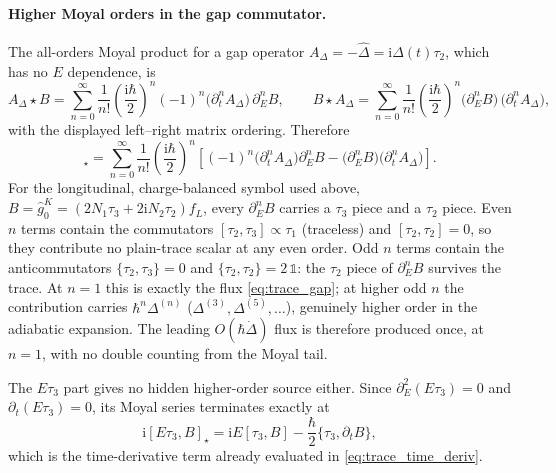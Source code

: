 \documentclass[
  aps,
  prb,
  preprint,
  superscriptaddress,
  longbibliography,
  nofootinbib
]{revtex4-2}
\newcommand{\ii}{\mathrm{i}}
\newcommand{\DOS}{N_1}
\newcommand{\fL}{f_L}
\newcommand{\hatg}{\hat{g}}
\newcommand{\hatD}{\hat{\Delta}}
\providecommand{\openone}{}\renewcommand{\openone}{\mathds{1}}
\begin{document}
\paragraph{Higher Moyal orders in the gap commutator.} The all-orders
Moyal product for a gap operator
\(A_\Delta=-\hatD=\ii\Delta(t)\tau_2\), which has no \(E\) dependence, is
\begin{equation}
  A_\Delta\star B
  =
  \sum_{n=0}^{\infty}
  \frac{1}{n!}\left(\frac{\ii\hbar}{2}\right)^n
  (-1)^n
  \bigl(\partial_t^n A_\Delta\bigr)\,
  \partial_E^n B,
  \qquad
  B\star A_\Delta
  =
  \sum_{n=0}^{\infty}
  \frac{1}{n!}\left(\frac{\ii\hbar}{2}\right)^n
  \bigl(\partial_E^n B\bigr)\,
  \bigl(\partial_t^n A_\Delta\bigr),
  \label{eq:gap_moyal_all_orders}
\end{equation}
with the displayed left--right matrix ordering. Therefore
\begin{equation}
  [A_\Delta,B]_\star
  =
  \sum_{n=0}^{\infty}
  \frac{1}{n!}\left(\frac{\ii\hbar}{2}\right)^n
  \left[
    (-1)^n\bigl(\partial_t^n A_\Delta\bigr)\partial_E^n B
    -
    \bigl(\partial_E^n B\bigr)\bigl(\partial_t^n A_\Delta\bigr)
  \right].
  \label{eq:gap_comm_all_orders}
\end{equation}
For the longitudinal, charge-balanced symbol used above,
\(B=\hatg_0^K=(2\DOS\tau_3+2\ii N_2\tau_2)\fL\), every
\(\partial_E^n B\) carries a \(\tau_3\) piece and a \(\tau_2\) piece. Even
\(n\) terms contain the commutators \([\tau_2,\tau_3]\propto\tau_1\)
(traceless) and \([\tau_2,\tau_2]=0\), so they contribute no plain-trace
scalar at any even order. Odd \(n\) terms contain the anticommutators
\(\{\tau_2,\tau_3\}=0\) and \(\{\tau_2,\tau_2\}=2\,\openone\): the
\(\tau_2\) piece of \(\partial_E^n B\) survives the trace. At \(n=1\) this
is exactly the flux \cref{eq:trace_gap}; at higher odd \(n\) the
contribution carries \(\hbar^n\Delta^{(n)}\)
(\(\Delta^{(3)},\Delta^{(5)},\ldots\)), genuinely higher order in the
adiabatic expansion. The leading \(O(\hbar\dot\Delta)\) flux is therefore
produced once, at \(n=1\), with no double counting from the Moyal tail.

The \(E\tau_3\) part gives no hidden higher-order source either. Since
\(\partial_E^2(E\tau_3)=0\) and \(\partial_t(E\tau_3)=0\), its Moyal series
terminates exactly at
\begin{equation}
  \ii[E\tau_3,B]_\star
  =
  \ii E[\tau_3,B]
  -
  \frac{\hbar}{2}\{\tau_3,\partial_t B\},
  \label{eq:E_moyal_exact_test}
\end{equation}
which is the time-derivative term already evaluated in
\cref{eq:trace_time_deriv}.
\end{document}

